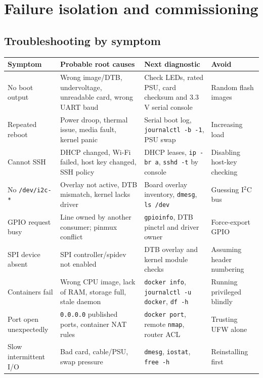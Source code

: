 \documentclass[10pt,oneside,openany]{report}
\newcommand{\code}[1]{\texttt{#1}}
\begin{document}
\chapter{Failure isolation and commissioning}
\section{Troubleshooting by symptom}
\begin{center}\small\begin{longtable}{@{}p{2.55cm}p{4.5cm}p{4.25cm}p{2.6cm}@{}}\toprule
\textbf{Symptom} & \textbf{Probable root causes} & \textbf{Next diagnostic} & \textbf{Avoid}\\\midrule\endhead
No boot output & Wrong image/DTB, undervoltage, unreadable card, wrong UART baud & Check LEDs, rated PSU, card checksum and 3.3\,V serial console & Random flash images\\
Repeated reboot & Power droop, thermal issue, media fault, kernel panic & Serial boot log, \code{journalctl -b -1}, PSU swap & Increasing load\\
Cannot SSH & DHCP changed, Wi-Fi failed, host key changed, SSH policy & DHCP leases, \code{ip -br a}, \code{sshd -t} by console & Disabling host-key checking\\
No \code{/dev/i2c-*} & Overlay not active, DTB mismatch, kernel lacks driver & Board overlay inventory, \code{dmesg}, \code{ls /dev} & Guessing I\(^{2}\)C bus\\
GPIO request busy & Line owned by another consumer; pinmux conflict & \code{gpioinfo}, DTB pinctrl and driver owner & Force-export GPIO\\
SPI device absent & SPI controller/spidev not enabled & DTB overlay and kernel module checks & Assuming header numbering\\
Containers fail & Wrong CPU image, lack of RAM, storage full, stale daemon & \code{docker info}, \code{journalctl -u docker}, \code{df -h} & Running privileged blindly\\
Port open unexpectedly & \code{0.0.0.0} published ports, container NAT rules & \code{docker port}, remote \code{nmap}, router ACL & Trusting UFW alone\\
Slow intermittent I/O & Bad card, cable/PSU, swap pressure & \code{dmesg}, \code{iostat}, \code{free -h} & Reinstalling first\\
\bottomrule\end{longtable}\end{center}
\end{document}
